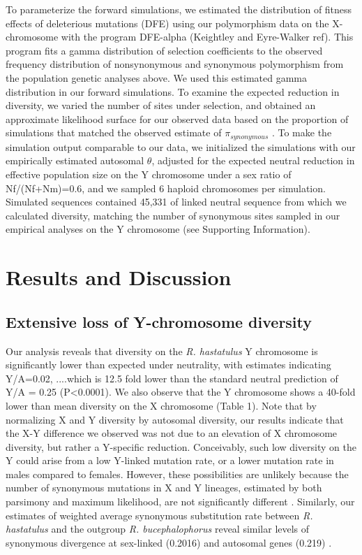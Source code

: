 \documentclass[9pt,twocolumn,twoside]{gsajnl}
\begin{document}
To parameterize the forward simulations, we estimated the distribution of fitness effects of deleterious mutations (DFE) using our polymorphism data on the X-chromosome with the program DFE-alpha (Keightley and Eyre-Walker ref). This program fits a gamma distribution of selection coefficients to the observed frequency distribution of nonsynonymous and synonymous polymorphism from the population genetic analyses above. We used this estimated gamma distribution in our forward simulations. To examine the expected reduction in diversity, we varied the number of sites under selection, and obtained an approximate likelihood surface for our observed data based on the proportion of simulations that matched the observed estimate of $\pi_{synonymous}$ . To make the simulation output comparable to our data, we initialized the simulations with our empirically estimated autosomal $\theta$, adjusted for the expected neutral reduction in effective population size on the Y chromosome under a sex ratio of Nf/(Nf+Nm)=0.6, and we sampled 6 haploid chromosomes per simulation. Simulated sequences contained 45,331 of linked neutral sequence from which we calculated diversity, matching the number of synonymous sites sampled in our empirical analyses on the Y chromosome (see Supporting Information).



\section*{Results and Discussion}

\subsection*{Extensive loss of Y-chromosome diversity}
Our analysis reveals that diversity on the \textit{R. hastatulus} Y chromosome is significantly lower than expected under neutrality, with estimates indicating Y/A=0.02, ....which is 12.5 fold lower than the standard neutral prediction of Y/A = 0.25 (P<0.0001). We also observe that the Y chromosome shows a 40-fold lower than mean diversity on the X chromosome (Table 1). Note that by normalizing X and Y diversity by autosomal diversity, our results indicate that the X-Y difference we observed was not due to an elevation of X chromosome diversity, but rather a Y-specific reduction. Conceivably, such low diversity on the Y could arise from a low Y-linked mutation rate, or a lower mutation rate in males compared to females. However, these possibilities are unlikely because the number of synonymous mutations in X and Y lineages, estimated by both parsimony and maximum likelihood, are not significantly different \citep{hough2014}. Similarly, our estimates of weighted average synonymous substitution rate between \textit{R. hastatulus} and the outgroup \textit{R. bucephalophorus} reveal similar levels of synonymous divergence at sex-linked (0.2016) and autosomal genes (0.219) \citep{hough2014}.
\end{document}
